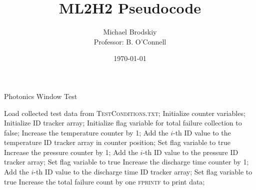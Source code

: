 


\title{ML2H2 Pseudocode}
\date{\today}
\author{Michael Brodskiy\\ \small Professor: B. O'Connell}



\maketitle

    \begin{algorithm}
      \caption{Photonics Window Test}\label{Photonics}
      \begin{algorithmic}[1]
        \State Load collected test data from \textsc{TestConditions.txt};
        \State Initialize counter variables;
        \State Initialize ID tracker array;
        \State Initialize flag variable for total failure collection to false;
                \State Increase the temperature counter by 1;
                \State Add the $i$-th ID value to the temperature ID tracker array in counter position;
                \State Set flag variable to true
            \EndIf
                \State Increase the pressure counter by 1;
                \State Add the $i$-th ID value to the pressure ID tracker array;
                \State Set flag variable to true
            \EndIf
                \State Increase the discharge time counter by 1;
                \State Add the $i$-th ID value to the discharge time ID tracker array;
                \State Set flag variable to true
            \EndIf
                \State Increase the total failure count by one
            \EndIf
        \EndFor
            {\textsc{fprintf} to print data};
        \EndFor
        \EndProcedure
      \end{algorithmic}
    \end{algorithm}



